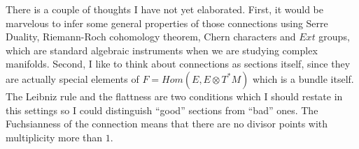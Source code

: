 \documentclass[11pt]{article}
\begin{document}
    There is a couple of thoughts I have not yet elaborated.
    First, it would be marvelous to infer some general properties
    of those connections
    using Serre Duality, Riemann-Roch cohomology theorem, Chern characters
    and $Ext$ groups, which are standard algebraic
    instruments when we are studying complex manifolds.
    Second, I like to think about connections as
        sections itself, since they are actually special elements of
        $F = Hom(E, E \otimes T^*M )$ which is a bundle itself.
        The Leibniz rule and the flattness are two conditions which I
    should restate in this settings so I could distinguish \enquote{good}
    sections from \enquote{bad} ones.
    The Fuchsianness of the connection means that there are no divisor points
    with multiplicity more than $1$.
%
\end{document}
